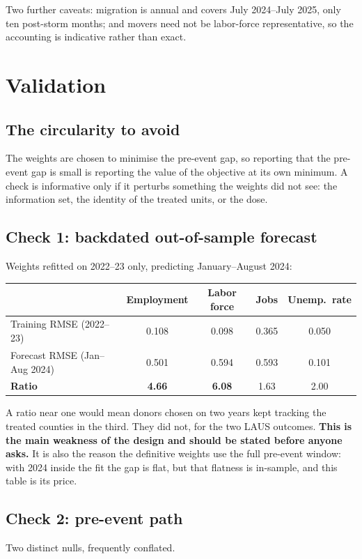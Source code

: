 \documentclass[11pt,a4paper]{article}
\begin{document}
Two further caveats: migration is annual and covers July 2024--July 2025, only ten post-storm months;
and movers need not be labor-force representative, so the accounting is indicative rather than exact.

\section{Validation}\label{sec:validation}

\subsection{The circularity to avoid}
The weights are chosen to minimise the pre-event gap, so reporting that the pre-event gap is small is
reporting the value of the objective at its own minimum. A check is informative only if it perturbs
something the weights did not see: the information set, the identity of the treated units, or the dose.

\subsection{Check 1: backdated out-of-sample forecast}
Weights refitted on 2022--23 only, predicting January--August 2024:
\begin{center}\small
\begin{tabular}{lcccc}
\toprule
 & Employment & Labor force & Jobs & Unemp.\ rate\\
\midrule
Training RMSE (2022--23) & 0.108 & 0.098 & 0.365 & 0.050\\
Forecast RMSE (Jan--Aug 2024) & 0.501 & 0.594 & 0.593 & 0.101\\
\textbf{Ratio} & \textbf{4.66} & \textbf{6.08} & 1.63 & 2.00\\
\bottomrule
\end{tabular}
\end{center}
A ratio near one would mean donors chosen on two years kept tracking the treated counties in the third.
They did not, for the two LAUS outcomes. \textbf{This is the main weakness of the design and should be
stated before anyone asks.} It is also the reason the definitive weights use the full pre-event window:
with 2024 inside the fit the gap is flat, but that flatness is in-sample, and this table is its price.

\subsection{Check 2: pre-event path}
Two distinct nulls, frequently conflated.
\end{document}

